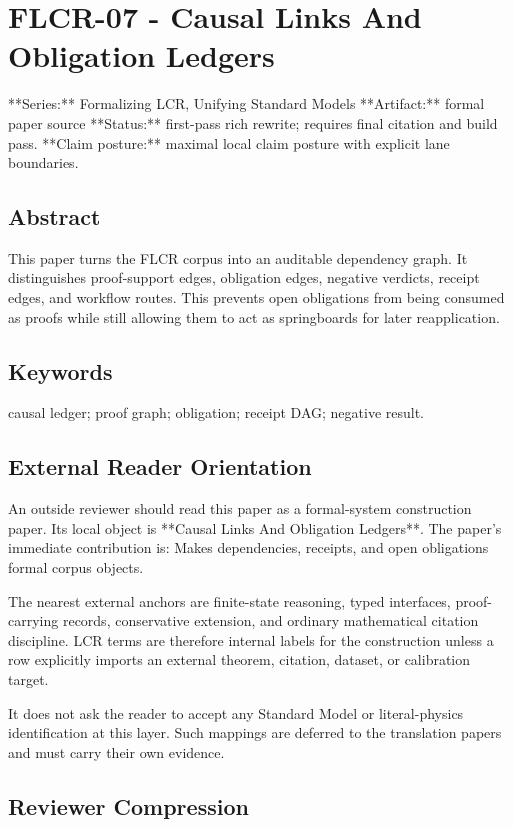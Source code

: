 \documentclass[11pt]{article}
\begin{document}
\section*{FLCR-07 - Causal Links And Obligation Ledgers}

**Series:** Formalizing LCR, Unifying Standard Models
**Artifact:** formal paper source
**Status:** first-pass rich rewrite; requires final citation and build pass.
**Claim posture:** maximal local claim posture with explicit lane boundaries.

\subsection*{Abstract}

This paper turns the FLCR corpus into an auditable dependency graph. It distinguishes proof-support edges, obligation edges, negative verdicts, receipt edges, and workflow routes. This prevents open obligations from being consumed as proofs while still allowing them to act as springboards for later reapplication.

\subsection*{Keywords}

causal ledger; proof graph; obligation; receipt DAG; negative result.

\subsection*{External Reader Orientation}

An outside reviewer should read this paper as a formal-system construction paper. Its local object is **Causal Links And Obligation Ledgers**. The paper's immediate contribution is: Makes dependencies, receipts, and open obligations formal corpus objects.

The nearest external anchors are finite-state reasoning, typed interfaces, proof-carrying records, conservative extension, and ordinary mathematical citation discipline. LCR terms are therefore internal labels for the construction unless a row explicitly imports an external theorem, citation, dataset, or calibration target.

It does not ask the reader to accept any Standard Model or literal-physics identification at this layer. Such mappings are deferred to the translation papers and must carry their own evidence.

\subsection*{Reviewer Compression}
\end{document}
